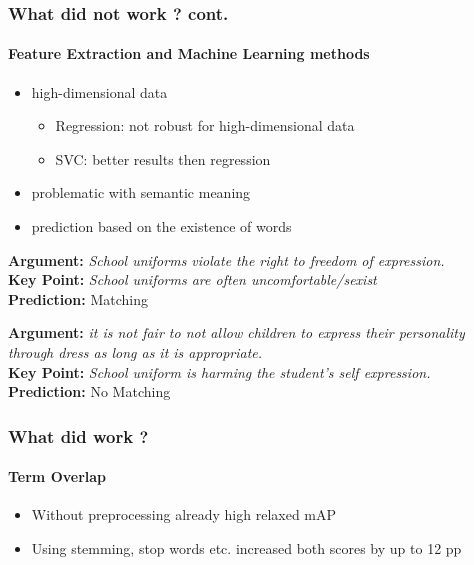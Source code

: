 \documentclass[english,handout]{mlutalk}
\begin{document}
\begin{frame}
  \frametitle{What did not work ? cont. }
  \framesubtitle{Feature Extraction and Machine Learning methods}
    
    	\begin{itemize}
      \item high-dimensional data 
      	\begin{itemize}
      		\item Regression: not robust for high-dimensional data
      		\item SVC: better results then regression
      	\end{itemize}
	\end{itemize}
	
    \begin{itemize}
      \item problematic with semantic meaning
      \item prediction based on the existence of words
	\end{itemize}
   
    \begin{example}
      \textbf{Argument:} \textit{School uniforms violate the right to freedom of expression.}\\
      \textbf{Key Point:} \textit{School uniforms are often uncomfortable/sexist}\\
      \textbf{Prediction:} Matching
    \end{example}
    
     \begin{example}
      \textbf{Argument:} \textit{it is not fair to not allow children to express their personality through dress as long as it is appropriate.}\\
      \textbf{Key Point:} \textit{School uniform is harming the student's self expression.}\\
      \textbf{Prediction:} No Matching
    \end{example}

	
\end{frame}

\begin{frame}
  \frametitle{What did work ?}
  \framesubtitle{Term Overlap}
    
    \begin{itemize}
      \item Without preprocessing already high relaxed mAP
      \item Using stemming, stop words etc. increased both scores by up to 12 pp 
    \end{itemize}

\end{frame}
\end{document}
